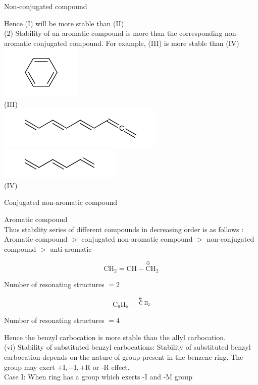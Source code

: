 \documentclass[10pt]{article}
\begin{document}
Non-conjugated compound

Hence (I) will be more stable than (II)\\
(2) Stability of an aromatic compound is more than the corresponding non-aromatic conjugated compound. For example, (III) is more stable than (IV)\\
\includegraphics{smile-945fe9ba05cfa17af6a186bc38fbe689a814b555}\\
(III)\\
\includegraphics{smile-85a4ade88f82ab0644b9815cdeec0d4a26b590bc}\\
\includegraphics{smile-490adf99e8fb55e17219fdfee5e840bc9a4fcd5f}\\
(IV)

Conjugated non-aromatic compound

Aromatic compound\\
Thus stability series of different compounds in decreasing order is as follows :\\
Aromatic compound $>$ conjugated non-aromatic compound $>$ non-conjugated compound $>$ anti-aromatic

$$
\mathrm{CH}_{2}=\mathrm{CH}-\stackrel{\oplus}{\mathrm{C}} \mathrm{H}_{2}
$$

Number of resonating structures $=2$

$$
\mathrm{C}_{6} \mathrm{H}_{5}-\stackrel{\stackrel{\text { セ. }}{\mathrm{C}} \mathrm{H}_{2}}{ }
$$

Number of resonating structures $=4$

Hence the benzyl carbocation is more stable than the allyl carbocation.\\
(vi) Stability of substituted benzyl carbocations: Stability of substituted benzyl carbocation depends on the nature of group present in the benzene ring. The group may exert $+\mathrm{I},-\mathrm{I},+\mathrm{R}$ or -R effect.\\
Case I: When ring has a group which exerts -I and -M group
\end{document}
